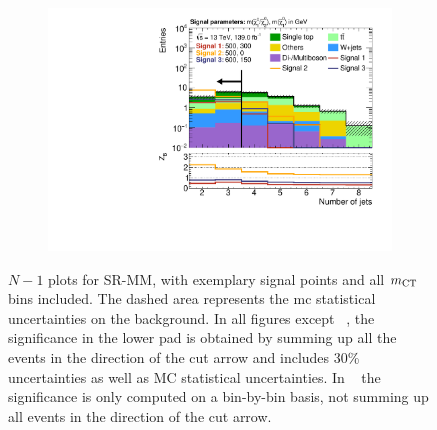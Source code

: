 \begin{figure}
	\begin{subfigure}[b]{0.45\linewidth}
		\centering\includegraphics[width=\textwidth]{n1_SRMM_mct_bins/nJet30.pdf}
		\vspace{-2em}
		\caption{\label{fig:Wh_reopt_second_round_n1_srmm_njet}}
	\end{subfigure}
	\caption{$N-1$ plots for SR-MM, with exemplary signal points and all $m_{\textrm{CT}}$ bins included. The dashed area represents the \gls{mc} statistical uncertainties on the background. In all figures except \figname~, the significance in the lower pad is obtained by summing up all the events in the direction of the cut arrow and includes 30\% uncertainties as well as MC statistical uncertainties. In \figname~ the significance is only computed on a bin-by-bin basis, \ie not summing up all events in the direction of the cut arrow.}
	\label{fig:Wh_reopt_second_round_n1_srmm}
\end{figure}


